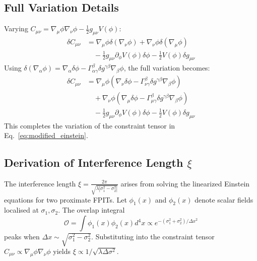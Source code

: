 \documentclass[twocolumn]{article}
\begin{document}
	\subsection{Full Variation Details}
	Varying $C_{\mu\nu} = \nabla_\mu\phi\nabla_\nu\phi - \frac{1}{2}g_{\mu\nu}V(\phi)$:  
	\begin{equation}
		\begin{split}
			\delta C_{\mu\nu} &= \nabla_\mu\phi \delta(\nabla_\nu\phi) + \nabla_\nu\phi \delta(\nabla_\mu\phi) \\  
			&\quad - \frac{1}{2}g_{\mu\nu} \partial_\phi V(\phi) \delta\phi - \frac{1}{2}V(\phi) \delta g_{\mu\nu}
		\end{split}
	\end{equation}
	Using $\delta(\nabla_\alpha\phi) = \nabla_\alpha\delta\phi - \Gamma^\beta_{\alpha\gamma}\delta g^{\gamma\beta} \nabla_\beta\phi$, the full variation becomes:  
	\begin{equation}
		\begin{split}
			\delta C_{\mu\nu} &= \nabla_\mu\phi (\nabla_\nu\delta\phi - \Gamma^\beta_{\nu\gamma}\delta g^{\gamma\beta} \nabla_\beta\phi) \\  
			&\quad + \nabla_\nu\phi (\nabla_\mu\delta\phi - \Gamma^\beta_{\mu\gamma}\delta g^{\gamma\beta} \nabla_\beta\phi) \\  
			&\quad - \frac{1}{2}g_{\mu\nu} \partial_\phi V(\phi) \delta\phi - \frac{1}{2}V(\phi) \delta g_{\mu\nu}
		\end{split}
	\end{equation}
	This completes the variation of the constraint tensor in Eq.~\eqref{eq:modified_einstein}.  
	
	\subsection{Derivation of Interference Length \texorpdfstring{\(\xi\)}{xi}}\label{app:xi}
	
	The interference length \(\xi = \frac{2\pi}{\sqrt{\lambda|\sigma_1^2 - \sigma_2^2|}}\) arises from solving the linearized Einstein equations for two proximate FPITs. Let \(\phi_1(x)\) and \(\phi_2(x)\) denote scalar fields localised at \(\sigma_1, \sigma_2\). The overlap integral  
	\begin{equation}
		\mathcal{O} = \int \phi_1(x) \phi_2(x) d^4x \propto e^{-(\sigma_1^2 + \sigma_2^2)/\Delta x^2}
	\end{equation}
	peaks when \(\Delta x \sim \sqrt{\sigma_1^2 - \sigma_2^2}\). Substituting into the constraint tensor \(C_{\mu\nu} \propto \nabla_\mu\phi\nabla_\nu\phi\) yields \(\xi \propto 1/\sqrt{\lambda \Delta\sigma^2}\). 
	
\end{document}

